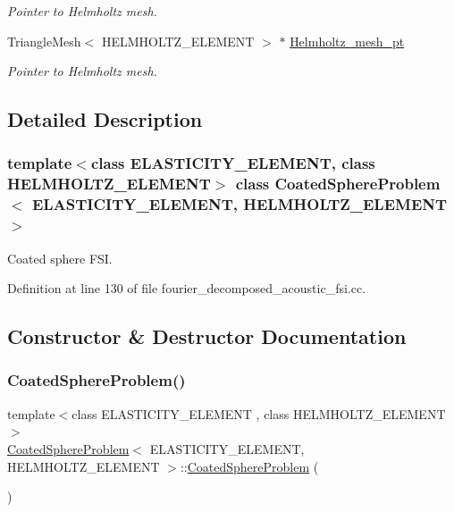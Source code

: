 \begin{DoxyCompactItemize}
\begin{DoxyCompactList}\small\item\em Pointer to Helmholtz mesh. \end{DoxyCompactList}\item 
Triangle\+Mesh$<$ H\+E\+L\+M\+H\+O\+L\+T\+Z\+\_\+\+E\+L\+E\+M\+E\+NT $>$ $\ast$ \hyperlink{classCoatedSphereProblem_aabab389170891d6387c3cd9a7aa92f24}{Helmholtz\+\_\+mesh\+\_\+pt}
\begin{DoxyCompactList}\small\item\em Pointer to Helmholtz mesh. \end{DoxyCompactList}\end{DoxyCompactItemize}


\subsection{Detailed Description}
\subsubsection*{template$<$class E\+L\+A\+S\+T\+I\+C\+I\+T\+Y\+\_\+\+E\+L\+E\+M\+E\+NT, class H\+E\+L\+M\+H\+O\+L\+T\+Z\+\_\+\+E\+L\+E\+M\+E\+NT$>$\newline
class Coated\+Sphere\+Problem$<$ E\+L\+A\+S\+T\+I\+C\+I\+T\+Y\+\_\+\+E\+L\+E\+M\+E\+N\+T, H\+E\+L\+M\+H\+O\+L\+T\+Z\+\_\+\+E\+L\+E\+M\+E\+N\+T $>$}

Coated sphere F\+SI. 

Definition at line 130 of file fourier\+\_\+decomposed\+\_\+acoustic\+\_\+fsi.\+cc.



\subsection{Constructor \& Destructor Documentation}
\mbox{\label{classCoatedSphereProblem_ab9c983e7f0bed66f13d59bd65d6d151b}} 
\subsubsection{\texorpdfstring{Coated\+Sphere\+Problem()}{CoatedSphereProblem()}\hspace{0.1cm}{\footnotesize\ttfamily [1/2]}}
{\footnotesize\ttfamily template$<$class E\+L\+A\+S\+T\+I\+C\+I\+T\+Y\+\_\+\+E\+L\+E\+M\+E\+NT , class H\+E\+L\+M\+H\+O\+L\+T\+Z\+\_\+\+E\+L\+E\+M\+E\+NT $>$ \\
\hyperlink{classCoatedSphereProblem}{Coated\+Sphere\+Problem}$<$ E\+L\+A\+S\+T\+I\+C\+I\+T\+Y\+\_\+\+E\+L\+E\+M\+E\+NT, H\+E\+L\+M\+H\+O\+L\+T\+Z\+\_\+\+E\+L\+E\+M\+E\+NT $>$\+::\hyperlink{classCoatedSphereProblem}{Coated\+Sphere\+Problem} (\begin{DoxyParamCaption}{ }\end{DoxyParamCaption})}



